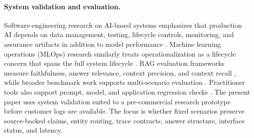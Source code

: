 \paragraph{System validation and evaluation.}
Software-engineering research on AI-based systems emphasizes that production AI depends on data management, testing, lifecycle controls, monitoring, and assurance artifacts in addition to model performance \citep{martinezfernandez2022seai,ashmore2021assuring}. Machine learning operations (MLOps) research similarly treats operationalization as a lifecycle concern that spans the full system lifecycle \citep{kreuzberger2023mlops}. RAG evaluation frameworks measure faithfulness, answer relevance, context precision, and context recall \citep{es2023ragas,saadfalcon2024ares}, while broader benchmark work supports multi-scenario evaluation \citep{liang2023helm}. Practitioner tools also support prompt, model, and application regression checks \citep{promptfoo2026software}. The present paper uses system validation suited to a pre-commercial research prototype before customer logs are available. The focus is whether fixed scenarios preserve source-backed claims, entity routing, trace contracts, answer structure, interface status, and latency.
